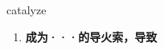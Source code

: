 
\begin{frame}
{\huge catalyze}
\begin{center}
\begin{enumerate}\Large
  \item \textbf{成为···的导火索，导致}
\end{enumerate}
\end{center}
\end{frame}
